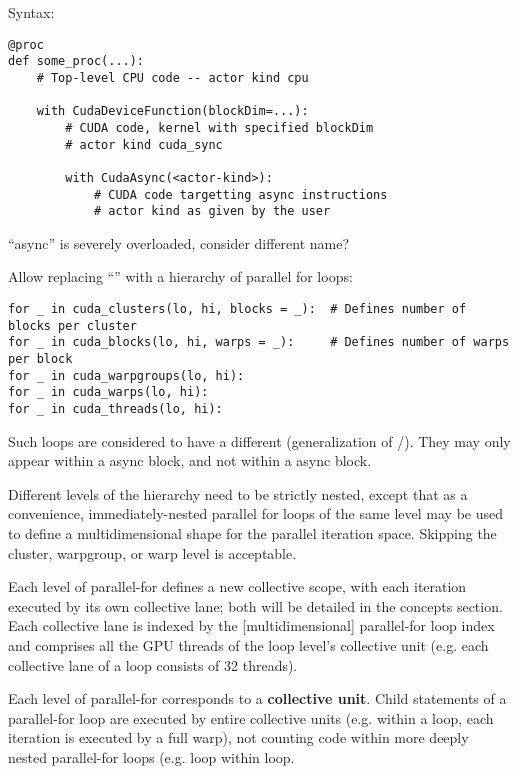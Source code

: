 Syntax:
{\color{lightttColor}
\begin{verbatim}
@proc
def some_proc(...):
    # Top-level CPU code -- actor kind cpu

    with CudaDeviceFunction(blockDim=...):
        # CUDA code, kernel with specified blockDim
        # actor kind cuda_sync

        with CudaAsync(<actor-kind>):
            # CUDA code targetting async instructions
            # actor kind as given by the user
\end{verbatim}
}

 ``async'' is severely overloaded, consider different name?

\filbreak
{} Allow replacing ``'' with a hierarchy of parallel for loops:

\filbreak
{\color{lightttColor}
\begin{verbatim}
for _ in cuda_clusters(lo, hi, blocks = _):  # Defines number of blocks per cluster
for _ in cuda_blocks(lo, hi, warps = _):     # Defines number of warps per block
for _ in cuda_warpgroups(lo, hi):
for _ in cuda_warps(lo, hi):
for _ in cuda_threads(lo, hi):
\end{verbatim}
}

\filbreak
Such loops are considered to have a different  (generalization of /).
They may only appear within a  async block, and not within a  async block.

\filbreak
Different levels of the hierarchy need to be strictly nested, except that as a convenience, immediately-nested parallel for loops of the same level may be used to define a multidimensional shape for the parallel iteration space.
Skipping the cluster, warpgroup, or warp level is acceptable.

\filbreak
Each level of parallel-for defines a new collective scope, with each iteration executed by its own collective lane; both will be detailed in the concepts section.
Each collective lane is indexed by the [multidimensional] parallel-for loop index and comprises all the GPU threads of the loop level's collective unit (e.g. each collective lane of a  loop consists of 32 threads).

\filbreak
Each level of parallel-for corresponds to a \textbf{collective unit}.
Child statements of a parallel-for loop are executed by entire collective units (e.g. within a  loop, each iteration is executed by a full warp), not counting code within more deeply nested parallel-for loops (e.g.  loop within  loop.

